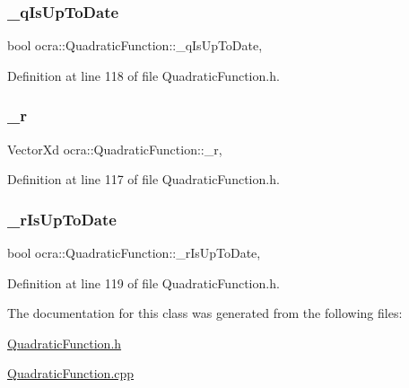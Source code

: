 \subsubsection{\texorpdfstring{\+\_\+q\+Is\+Up\+To\+Date}{\_qIsUpToDate}}
{\footnotesize\ttfamily bool ocra\+::\+Quadratic\+Function\+::\+\_\+q\+Is\+Up\+To\+Date\hspace{0.3cm}{\ttfamily [mutable]}, {\ttfamily [protected]}}



Definition at line 118 of file Quadratic\+Function.\+h.

\hypertarget{classocra_1_1QuadraticFunction_a56771e89a23a61fcc15cfd4d10c6956c}{}\label{classocra_1_1QuadraticFunction_a56771e89a23a61fcc15cfd4d10c6956c} 
\subsubsection{\texorpdfstring{\+\_\+r}{\_r}}
{\footnotesize\ttfamily Vector\+Xd ocra\+::\+Quadratic\+Function\+::\+\_\+r\hspace{0.3cm}{\ttfamily [mutable]}, {\ttfamily [protected]}}



Definition at line 117 of file Quadratic\+Function.\+h.

\hypertarget{classocra_1_1QuadraticFunction_a9862b46e064bccd9e83b10e9ceb4d2f0}{}\label{classocra_1_1QuadraticFunction_a9862b46e064bccd9e83b10e9ceb4d2f0} 
\subsubsection{\texorpdfstring{\+\_\+r\+Is\+Up\+To\+Date}{\_rIsUpToDate}}
{\footnotesize\ttfamily bool ocra\+::\+Quadratic\+Function\+::\+\_\+r\+Is\+Up\+To\+Date\hspace{0.3cm}{\ttfamily [mutable]}, {\ttfamily [protected]}}



Definition at line 119 of file Quadratic\+Function.\+h.



The documentation for this class was generated from the following files\+:\begin{DoxyCompactItemize}
\item 
\hyperlink{QuadraticFunction_8h}{Quadratic\+Function.\+h}\item 
\hyperlink{QuadraticFunction_8cpp}{Quadratic\+Function.\+cpp}\end{DoxyCompactItemize}

